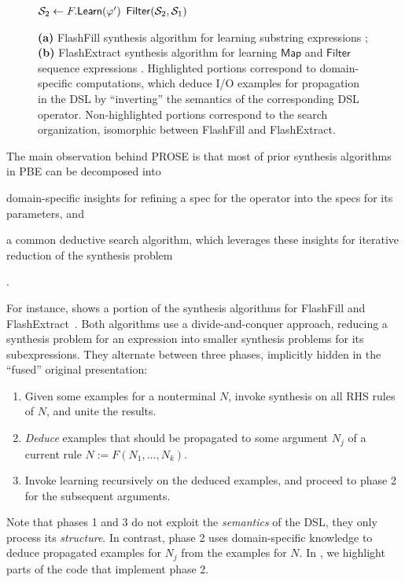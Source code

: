 \begin{figure}[p!]
\begin{fullpage}
\begin{algorithmic}
            \State $\mathcal{S}_2 \gets F.\mathsf{Learn}(\varphi')$
            \State \Return $\mathsf{Filter}(\mathcal{S}_2, \mathcal{S}_1)$
            \EndFunction
        \end{algorithmic}
        \vspace{3pt}
        \caption{\textbf{(a)} FlashFill synthesis algorithm for learning substring expressions \cite[Figure 7]{flashfill};
            \textbf{(b)} FlashExtract synthesis algorithm for learning $\mathsf{Map}$ and $\mathsf{Filter}$ sequence
            expressions \cite[Figure 6]{flashextract}.
            Highlighted portions correspond to domain-specific computations, which deduce I/O examples for propagation in
            the DSL by ``inverting'' the semantics of the corresponding DSL operator.
        Non-highlighted portions correspond to the search organization, isomorphic between FlashFill and FlashExtract.}
        \label{fig:prose:prior}
    \end{fullpage}
\end{figure}

The main observation behind PROSE is that most of prior synthesis algorithms in PBE can be decomposed into
\begin{enumerate*}[label=\textbf{(\alph*)}]
    \item domain-specific insights for refining a spec for the operator into the specs for its
        parameters, and
    \item a common deductive search algorithm, which leverages these insights for iterative reduction of the synthesis
        problem
\end{enumerate*}.

For instance,  shows a portion of the synthesis algorithms for FlashFill
\cite[Figure~7]{flashfill} and FlashExtract~\cite[Figure~6]{flashextract}.
Both algorithms use a divide-and-conquer approach, reducing a synthesis problem for an expression into smaller synthesis
problems for its subexpressions.
They alternate between three phases, implicitly hidden in the ``fused'' original presentation:
\begin{enumerate}[nosep]
    \item Given some examples for a nonterminal $N$, invoke synthesis on all RHS rules of $N$, and unite the results.
    \item \emph{Deduce} examples that should be propagated to some argument $N_j$ of a current rule $N := F(N_1, \dots,
        N_k)$.
    \item Invoke learning recursively on the deduced examples, and proceed to phase 2 for the subsequent arguments.
\end{enumerate}
Note that phases 1 and 3 do not exploit the \emph{semantics} of the DSL, they only process its \emph{structure}.
In contrast, phase 2 uses domain-specific knowledge to deduce propagated examples for $N_j$ from the examples for $N$.
In , we highlight parts of the code that implement phase 2.


